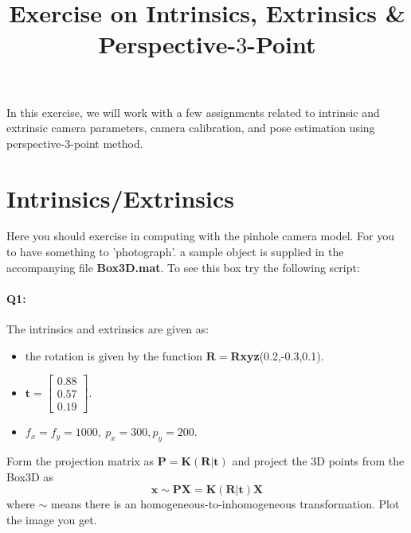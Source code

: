 \documentclass[a4paper]{article}
\begin{document}
\title{Exercise on Intrinsics, Extrinsics \& Perspective-$3$-Point}
\maketitle%

In this exercise, we will work with a few assignments related to intrinsic and extrinsic camera parameters, camera calibration, and pose estimation using perspective-3-point method.

\section{Intrinsics/Extrinsics}
Here you should exercise in computing with the pinhole camera model. For you to have something to 'photograph'. a sample object is supplied in the accompanying file \textbf{Box3D.mat}. To see this box try the following script:

\paragraph{Q1:}
The intrinsics and extrinsics are given as:
\begin{itemize}
\item the rotation is given by the function $\mathbf{R}=$\textbf{Rxyz}(0.2,-0.3,0.1).
\item $\mathbf{t}= \left[\begin{matrix}
0.88 \\ 0.57 \\  0.19
 \end{matrix}\right]$.
 \item $f_x=f_y=1000,\ p_x = 300, p_y = 200$.
\end{itemize}
Form the projection matrix as $\mathbf{P}=\mathbf{K}\left(\mathbf{R} | \mathbf{t}\right)$ and project the $3$D points from the Box3D as
$$
\mathbf{x} \sim \mathbf{PX}=\mathbf{K}\left(\mathbf{R} | \mathbf{t}\right) \mathbf{X}
$$
where $\sim$ means there is an homogeneous-to-inhomogeneous transformation.
Plot the image you get.
\end{document}

